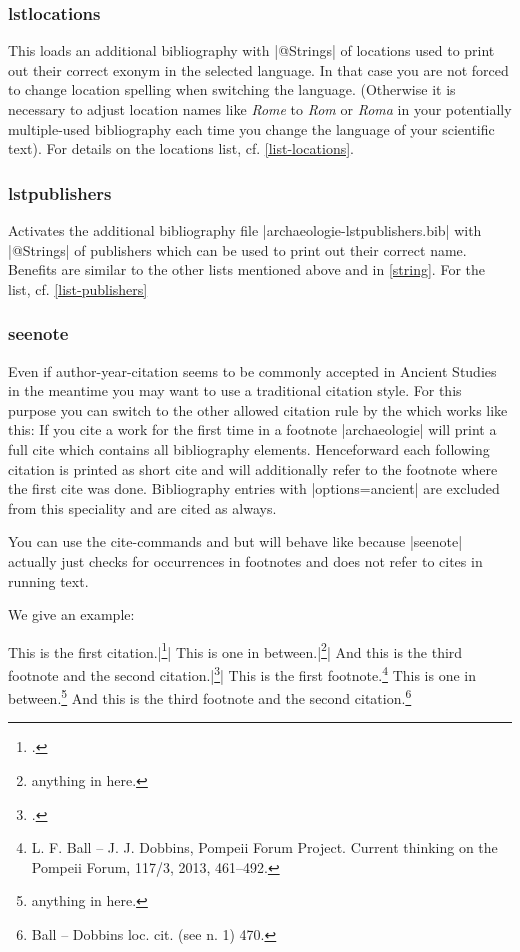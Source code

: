 \documentclass[a4paper,
10pt,
greek,
french,
spanish,
italian,
ngerman,
english
]{ltxdoc}
\begin{document}
\subsubsection{lstlocations}\label{lstlocations}
This loads an additional bibliography with |@Strings| of locations used to print out their correct exonym in the selected language. 
In that case you are not forced to change location spelling when switching the language. 
(Otherwise it is necessary to adjust location names like \emph{Rome} to \emph{Rom} or \emph{Roma} 
in your potentially multiple-used bibliography each time you change the language of your scientific text).
For details on the locations list, cf. \cref{list-locations}.

\subsubsection{lstpublishers}\label{lstpublishers}
Activates the additional bibliography file |archaeologie-lstpublishers.bib| with |@Strings| 
of publishers which can be used to print out their correct name. 
Benefits are similar to the other lists mentioned above and in \cref{string}.
For the list, cf. \cref{list-publishers}




\subsubsection{seenote}\label{seenote}
Even if author-year-citation seems to be commonly accepted in Ancient Studies in the meantime you may want to use a traditional citation style. 
For this purpose you can switch to the other allowed citation rule by the \DAI
which works like this:
If you cite a work for the first time in a footnote |archaeologie| will print a full cite which contains all bibliography elements.
Henceforward each following citation is printed as short cite and will additionally refer to the footnote where the first cite was done.
Bibliography entries with |options={ancient}| are excluded from this speciality and are cited as always.

You can use the cite-commands  and  but  
will behave like  because |seenote| actually just checks for occurrences in footnotes and does not refer to cites in running text.

We give an example:
\begin{tcolorbox}[examplebox] 
This is the first citation.|\footnote{\cite{Ball2013}.}|
This is one in between.|\footnote{anything in here.}|
And this is the third footnote and the second citation.|\footnote{\cite[470]{Ball2013}.}|
\tcblower
This is the first footnote.\footnote{L. F. Ball – J. J. Dobbins, Pompeii Forum Project. Current thinking on the Pompeii Forum, 117/3, 2013, 461–492.}
This is one in between.\footnote{anything in here.}
And this is the third footnote and the second citation.\footnote{Ball – Dobbins loc. cit. (see n. 1) 470.}
\end{tcolorbox}
\end{document}
